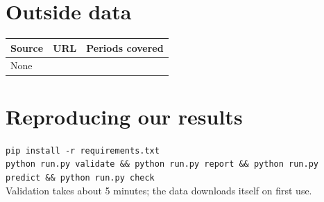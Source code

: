 \documentclass[11pt]{article}
\begin{document}
\section*{Outside data}
\begin{tabular}{lll}
\toprule
Source & URL & Periods covered \\
\midrule
None & & \\
\bottomrule
\end{tabular}

\section*{Reproducing our results}
\texttt{pip install -r requirements.txt}\\
\texttt{python run.py validate \&\& python run.py report \&\& python run.py predict \&\& python run.py check}\\
Validation takes about 5 minutes; the data downloads itself on first use.
\end{document}
